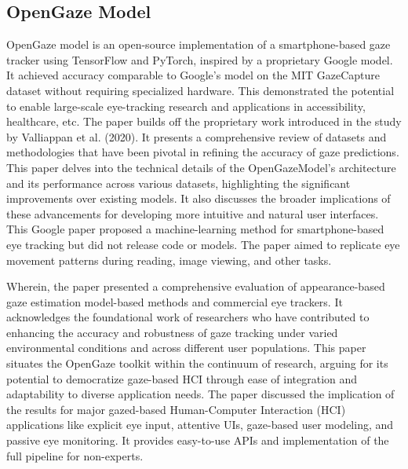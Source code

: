 \documentclass[conference]{IEEEtran}
\begin{document}
\vspace{\baselineskip}

\subsection{OpenGaze Model}
OpenGaze\cite{openGaze1}\cite{openGaze2} model is an open-source implementation of a smartphone-based gaze tracker using TensorFlow and PyTorch, inspired by a proprietary Google model.\cite{openGaze1} It achieved accuracy comparable to Google's model on the MIT GazeCapture\cite{gazecapture-1} dataset without requiring specialized hardware. This demonstrated the potential to enable large-scale eye-tracking research and applications in accessibility, healthcare, etc. 
The paper\cite{openGaze1} builds off the proprietary work introduced in the study by Valliappan et al. (2020).\cite{b6} It presents a comprehensive review of datasets and methodologies that have been pivotal in refining the accuracy of gaze predictions. This paper \cite{openGaze1} delves into the technical details of the OpenGazeModel's architecture and its performance across various datasets, highlighting the significant improvements over existing models. It also discusses the broader implications of these advancements for developing more intuitive and natural user interfaces. This Google paper proposed a machine-learning method for smartphone-based eye tracking but did not release code or models. The paper\cite{openGaze1} aimed to replicate eye movement patterns during reading, image viewing, and other tasks.

Wherein, the paper\cite{openGaze2} presented a comprehensive evaluation of appearance-based gaze estimation model-based methods and commercial eye trackers. It acknowledges the foundational work of researchers who have contributed to enhancing the accuracy and robustness of gaze tracking under varied environmental conditions and across different user populations. This paper\cite{openGaze2} situates the OpenGaze toolkit within the continuum of research, arguing for its potential to democratize gaze-based HCI through ease of integration and adaptability to diverse application needs. The paper\cite{openGaze2} discussed the implication of the results for major gazed-based Human-Computer Interaction (HCI) applications like explicit eye input, attentive UIs, gaze-based user modeling, and passive eye monitoring. It provides easy-to-use APIs and implementation of the full pipeline for non-experts. 
\end{document}
